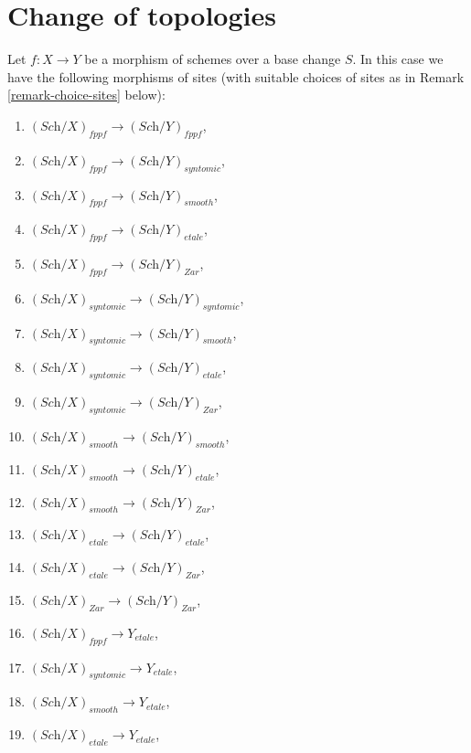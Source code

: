 \section{Change of topologies}
\label{section-change-topologies}

\noindent
Let $f : X \to Y$ be a morphism of schemes over a base change $S$.
In this case we have the following morphisms of sites
(with suitable choices of sites as in Remark \ref{remark-choice-sites}
below):
\begin{enumerate}
\item $(\textit{Sch}/X)_{fppf} \longrightarrow (\textit{Sch}/Y)_{fppf}$,
\item $(\textit{Sch}/X)_{fppf} \longrightarrow (\textit{Sch}/Y)_{syntomic}$,
\item $(\textit{Sch}/X)_{fppf} \longrightarrow (\textit{Sch}/Y)_{smooth}$,
\item $(\textit{Sch}/X)_{fppf} \longrightarrow (\textit{Sch}/Y)_{etale}$,
\item $(\textit{Sch}/X)_{fppf} \longrightarrow (\textit{Sch}/Y)_{Zar}$,
\item $(\textit{Sch}/X)_{syntomic} \longrightarrow (\textit{Sch}/Y)_{syntomic}$,
\item $(\textit{Sch}/X)_{syntomic} \longrightarrow (\textit{Sch}/Y)_{smooth}$,
\item $(\textit{Sch}/X)_{syntomic} \longrightarrow (\textit{Sch}/Y)_{etale}$,
\item $(\textit{Sch}/X)_{syntomic} \longrightarrow (\textit{Sch}/Y)_{Zar}$,
\item $(\textit{Sch}/X)_{smooth} \longrightarrow (\textit{Sch}/Y)_{smooth}$,
\item $(\textit{Sch}/X)_{smooth} \longrightarrow (\textit{Sch}/Y)_{etale}$,
\item $(\textit{Sch}/X)_{smooth} \longrightarrow (\textit{Sch}/Y)_{Zar}$,
\item $(\textit{Sch}/X)_{etale} \longrightarrow (\textit{Sch}/Y)_{etale}$,
\item $(\textit{Sch}/X)_{etale} \longrightarrow (\textit{Sch}/Y)_{Zar}$,
\item $(\textit{Sch}/X)_{Zar} \longrightarrow (\textit{Sch}/Y)_{Zar}$,
\item $(\textit{Sch}/X)_{fppf} \longrightarrow Y_{etale}$,
\item $(\textit{Sch}/X)_{syntomic} \longrightarrow Y_{etale}$,
\item $(\textit{Sch}/X)_{smooth} \longrightarrow Y_{etale}$,
\item $(\textit{Sch}/X)_{etale} \longrightarrow Y_{etale}$,

\end{enumerate}
